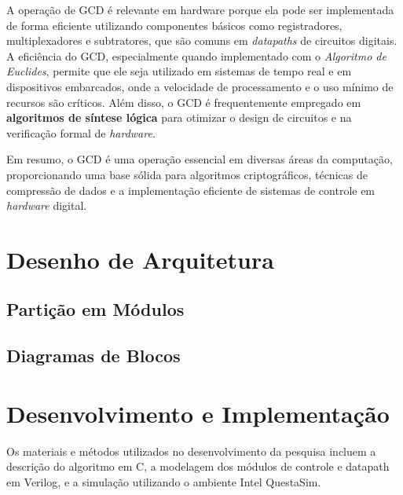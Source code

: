 \documentclass[a4paper,11pt]{article} %
\begin{document}
A operação de GCD é relevante em hardware porque ela pode ser implementada de forma eficiente utilizando componentes básicos como registradores, multiplexadores e subtratores, que são comuns em \textit{datapaths} de circuitos digitais. A eficiência do GCD, especialmente quando implementado com o \textit{Algoritmo de Euclides}, permite que ele seja utilizado em sistemas de tempo real e em dispositivos embarcados, onde a velocidade de processamento e o uso mínimo de recursos são críticos. Além disso, o GCD é frequentemente empregado em \textbf{algoritmos de síntese lógica} para otimizar o design de circuitos e na verificação formal de \textit{hardware}.

Em resumo, o GCD é uma operação essencial em diversas áreas da computação, proporcionando uma base sólida para algoritmos criptográficos, técnicas de compressão de dados e a implementação eficiente de sistemas de controle em \textit{hardware} digital.

\section{Desenho de Arquitetura}

\subsection{Partição em Módulos}

\subsection{Diagramas de Blocos}

\section{Desenvolvimento e Implementação}

Os materiais e métodos utilizados no desenvolvimento da pesquisa incluem a descrição do algoritmo em C, a modelagem dos módulos de controle e datapath em Verilog, e a simulação utilizando o ambiente Intel QuestaSim.
\end{document}
